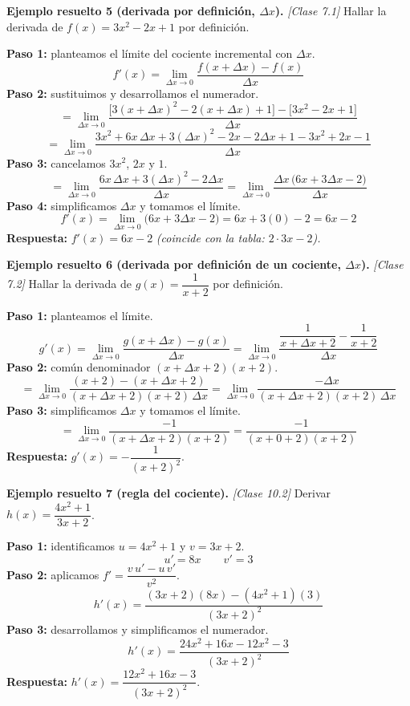 \documentclass[12pt, letterpaper]{article}
\begin{document}
\noindent\textbf{Ejemplo resuelto 5 (derivada por definición, $\Delta x$).} \emph{[Clase 7.1]}
Hallar la derivada de $f(x) = 3x^{2} - 2x + 1$ por definición.

\begin{cuadrosolucion}
  \textbf{Paso 1:} planteamos el límite del cociente incremental con $\Delta x$.
  \[
    f'(x) = \lim_{\Delta x \to 0} \frac{f(x + \Delta x) - f(x)}{\Delta x}
  \]
  \textbf{Paso 2:} sustituimos y desarrollamos el numerador.
  \[
    = \lim_{\Delta x \to 0} \frac{\bigl[3(x+\Delta x)^{2} - 2(x+\Delta x) + 1\bigr] - \bigl[3x^{2} - 2x + 1\bigr]}{\Delta x}
  \]
  \[
    = \lim_{\Delta x \to 0} \frac{3x^{2} + 6x\,\Delta x + 3(\Delta x)^{2} - 2x - 2\Delta x + 1 - 3x^{2} + 2x - 1}{\Delta x}
  \]
  \textbf{Paso 3:} cancelamos $3x^{2}$, $2x$ y $1$.
  \[
    = \lim_{\Delta x \to 0} \frac{6x\,\Delta x + 3(\Delta x)^{2} - 2\Delta x}{\Delta x}
    = \lim_{\Delta x \to 0} \frac{\Delta x\,\bigl(6x + 3\Delta x - 2\bigr)}{\Delta x}
  \]
  \textbf{Paso 4:} simplificamos $\Delta x$ y tomamos el límite.
  \[
    f'(x) = \lim_{\Delta x \to 0} \bigl(6x + 3\Delta x - 2\bigr) = 6x + 3(0) - 2 = 6x - 2
  \]
  \textbf{Respuesta:} $f'(x) = 6x - 2$ \quad \textit{(coincide con la tabla: $2\cdot 3x - 2$).}
\end{cuadrosolucion}

\noindent\textbf{Ejemplo resuelto 6 (derivada por definición de un cociente, $\Delta x$).} \emph{[Clase 7.2]}
Hallar la derivada de $g(x) = \dfrac{1}{x+2}$ por definición.

\begin{cuadrosolucion}
  \textbf{Paso 1:} planteamos el límite.
  \[
    g'(x) = \lim_{\Delta x \to 0} \frac{g(x+\Delta x) - g(x)}{\Delta x}
    = \lim_{\Delta x \to 0} \frac{\dfrac{1}{x + \Delta x + 2} - \dfrac{1}{x+2}}{\Delta x}
  \]
  \textbf{Paso 2:} común denominador $(x+\Delta x+2)(x+2)$.
  \[
    = \lim_{\Delta x \to 0} \frac{(x+2) - (x + \Delta x + 2)}{(x+\Delta x+2)(x+2)\,\Delta x}
    = \lim_{\Delta x \to 0} \frac{-\Delta x}{(x+\Delta x+2)(x+2)\,\Delta x}
  \]
  \textbf{Paso 3:} simplificamos $\Delta x$ y tomamos el límite.
  \[
    = \lim_{\Delta x \to 0} \frac{-1}{(x+\Delta x+2)(x+2)}
    = \frac{-1}{(x+0+2)(x+2)}
  \]
  \textbf{Respuesta:} $g'(x) = -\dfrac{1}{(x+2)^{2}}$.
\end{cuadrosolucion}

\newpage
\noindent\textbf{Ejemplo resuelto 7 (regla del cociente).} \emph{[Clase 10.2]}
Derivar $h(x) = \dfrac{4x^{2}+1}{3x+2}$.

\begin{cuadrosolucion}
  \textbf{Paso 1:} identificamos $u = 4x^{2}+1$ y $v = 3x+2$.
  \[
    u' = 8x
    \qquad
    v' = 3
  \]
  \textbf{Paso 2:} aplicamos $f' = \dfrac{v\,u' - u\,v'}{v^{2}}$.
  \[
    h'(x) = \frac{(3x+2)(8x) - (4x^{2}+1)(3)}{(3x+2)^{2}}
  \]
  \textbf{Paso 3:} desarrollamos y simplificamos el numerador.
  \[
    h'(x) = \frac{24x^{2} + 16x - 12x^{2} - 3}{(3x+2)^{2}}
  \]
  \textbf{Respuesta:} $h'(x) = \dfrac{12x^{2} + 16x - 3}{(3x+2)^{2}}$.
\end{cuadrosolucion}
\end{document}
